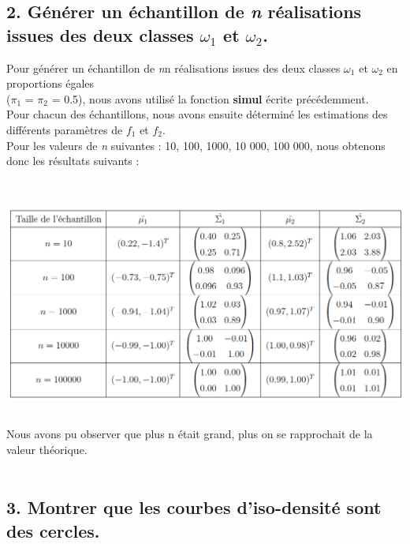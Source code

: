 \documentclass[a4paper, 8pt]{article}
\begin{document}
\newpage
\subsection*{2. Générer un échantillon de \textit{n} réalisations issues des deux classes $\omega_{1}$ et $\omega_{2}$.}

Pour générer un échantillon de \textit{n}n réalisations issues des deux classes $\omega_{1}$ et $\omega_{2}$ en proportions égales\\
($\pi_{1}$ = $\pi_{2}$ = 0.5), nous avons utilisé la fonction \textbf{simul} écrite précédemment.\\
Pour chacun des échantillons, nous avons ensuite déterminé les estimations des différents paramètres de \textit{$f_{1}$} et \textit{$f_{2}$}.\\
Pour les valeurs de \textit{n} suivantes : 10, 100, 1000, 10 000, 100 000, nous obtenons donc les résultats suivants :\\ \\
\includegraphics[height = 8cm, width = 15cm]{plots/f2.png}
\\ Nous avons pu observer que plus n était grand, plus on se rapprochait de la valeur théorique.\\ \\

\subsection*{3. Montrer que les courbes d'iso-densité sont des cercles.}
\end{document}
